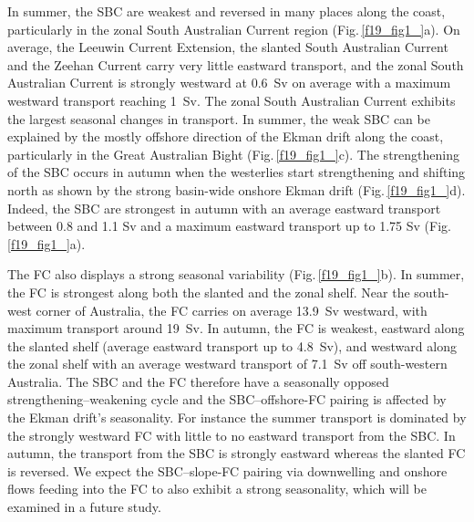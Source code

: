 \documentclass[preprint,3p,review,12pt]{elsarticle}
\begin{document}
In summer, the SBC are weakest and reversed in many places along the coast, particularly in the zonal South Australian Current region (Fig.\,\ref{f19_fig1_}a). On average, the Leeuwin Current Extension, the slanted South Australian Current and the Zeehan Current carry very little eastward transport, and the zonal South Australian Current is strongly westward at \SI{0.6}{Sv} on average with a maximum westward transport reaching \SI{1}{Sv}. The zonal South Australian Current exhibits the largest seasonal changes in transport. In summer, the weak SBC can be explained by the mostly offshore direction of the Ekman drift along the coast, particularly in the Great Australian Bight (Fig.\,\ref{f19_fig1_}c). The strengthening of the SBC occurs in autumn when the westerlies start strengthening and shifting north as shown by the strong basin-wide onshore Ekman drift (Fig.\,\ref{f19_fig1_}d). Indeed, the SBC are strongest in autumn with an average eastward transport between 0.8 and 1.1 Sv and a maximum eastward transport up to 1.75 Sv (Fig.\,\ref{f19_fig1_}a).

The FC also displays a strong seasonal variability (Fig.\,\ref{f19_fig1_}b). In summer, the FC is strongest along both the slanted and the zonal shelf. Near the south-west corner of Australia, the FC carries on average \SI{13.9}{Sv} westward, with maximum transport around \SI{19}{Sv}. In autumn, the FC is weakest, eastward along the slanted shelf (average eastward transport up to \SI{4.8}{Sv}), and westward along the zonal shelf with an average westward transport of \SI{7.1}{Sv} off south-western Australia. The SBC and the FC therefore have a seasonally opposed strengthening--weakening cycle and the SBC--offshore-FC pairing is affected by the Ekman drift's seasonality. For instance the summer transport is dominated by the strongly westward FC with little to no eastward transport from the SBC\@. In autumn, the transport from the SBC is strongly eastward whereas the slanted FC is reversed. We expect the SBC--slope-FC pairing via downwelling and onshore flows feeding into the FC to also exhibit a strong seasonality, which will be examined in a future study.
\end{document}
